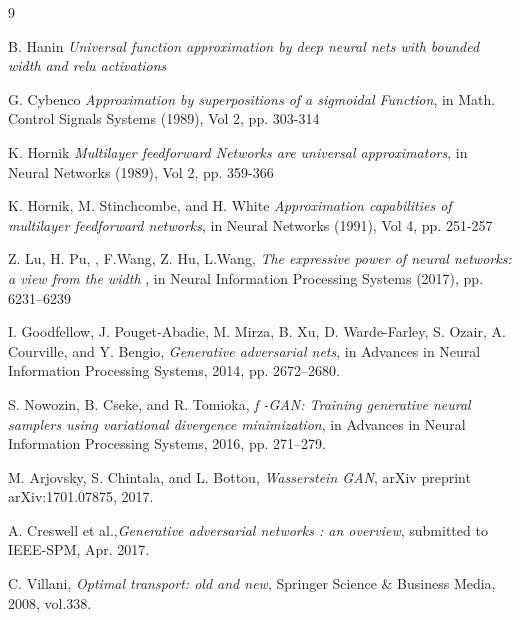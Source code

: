 \documentclass[12pt]{amsart}
\theoremstyle{plain}
\theoremstyle{definition}
\theoremstyle{remark}
\numberwithin{equation}{section}
\numberwithin{thm}{section}
\begin{document}
\begin{thebibliography}{9}



B. Hanin \emph{ Universal function approximation by deep neural nets with
bounded width and relu activations} 

G. Cybenco \emph{ Approximation by superpositions of a sigmoidal Function}, in Math. Control Signals Systems (1989), Vol 2, pp. 303-314

K. Hornik \emph{ Multilayer feedforward Networks are universal approximators}, in Neural Networks (1989), Vol 2, pp. 359-366

K. Hornik, M. Stinchcombe, and H. White \emph{ Approximation capabilities of multilayer feedforward networks}, in Neural Networks (1991), Vol 4, pp. 251-257

Z. Lu, H. Pu, , F.Wang, Z. Hu, L.Wang,\emph{ The expressive power of neural networks: a view from the width} 
, in Neural Information Processing Systems (2017), pp. 6231–6239



I. Goodfellow, J. Pouget-Abadie, M. Mirza, B. Xu, D. Warde-Farley, S. Ozair, A. Courville,
and Y. Bengio, \emph{Generative adversarial nets}, in Advances in Neural Information Processing Systems, 2014, pp. 2672–2680.

S. Nowozin, B. Cseke, and R. Tomioka, \emph{f -GAN: Training generative neural samplers using variational divergence minimization}, in Advances in Neural Information Processing Systems, 2016, pp. 271–279.

M. Arjovsky, S. Chintala, and L. Bottou, \emph{Wasserstein GAN}, arXiv preprint
arXiv:1701.07875, 2017.

A. Creswell et al.,\emph{Generative adversarial networks : an overview}, submitted to IEEE-SPM, Apr. 2017.

C. Villani, \emph{Optimal transport: old and new}, Springer Science $\&$ Business Media, 2008, vol.338.

\end{thebibliography}
\end{document}
